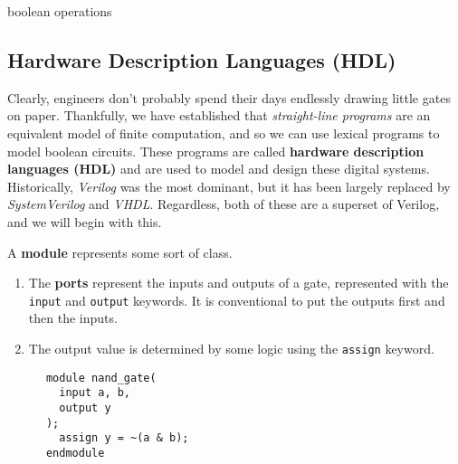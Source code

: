   \begin{definition}
    
  \end{definition}

  \begin{definition}
    
  \end{definition}

  \begin{definition}
    
  \end{definition}

  \begin{definition}
    
  \end{definition}


  boolean operations

\subsection{Hardware Description Languages (HDL)}

  Clearly, engineers don't probably spend their days endlessly drawing little gates on paper. Thankfully, we have established that \textit{straight-line programs} are an equivalent model of finite computation, and so we can use lexical programs to model boolean circuits. These programs are called \textbf{hardware description languages (HDL)} and are used to model and design these digital systems. Historically, \textit{Verilog} was the most dominant, but it has been largely replaced by \textit{SystemVerilog} and \textit{VHDL}. Regardless, both of these are a superset of Verilog, and we will begin with this. 

  \begin{definition}
    A \textbf{module} represents some sort of class. 
    \begin{enumerate}
      \item The \textbf{ports} represent the inputs and outputs of a gate, represented with the \texttt{input} and \texttt{output} keywords. It is conventional to put the outputs first and then the inputs. 
      \item The output value is determined by some logic using the \texttt{assign} keyword. 
    \end{enumerate}

    \begin{lstlisting}
      module nand_gate(
        input a, b,
        output y
      );
        assign y = ~(a & b);
      endmodule 
    \end{lstlisting}
  \end{definition}

